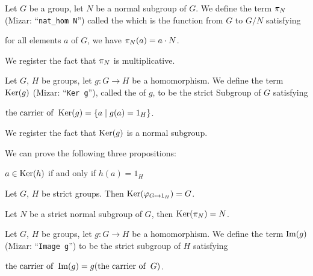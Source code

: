 \documentclass{article}
\begin{document}
\begin{definition}
Let $G$ be a group, let $N$ be a normal subgroup of $G$.
We define the term $\pi_{N}$ (Mizar: ``\verb#nat_hom N#'')
called the  which is the function from
$G$ to $G/N$ satisfying
\begin{defn}
\item for all elements $a$ of $G$, we have $\pi_{N}(a)=a\cdot N$.
\end{defn}
\end{definition}
We register the fact that $\pi_{N}$ is multiplicative.

\begin{definition}
Let $G$, $H$ be groups, let $g\colon G\to H$ be a homomorphism.
We define the term $\operatorname{Ker}(g)$ (Mizar: ``\verb#Ker g#''), called the
 of $g$, to be the strict Subgroup of $G$ satisfying
\begin{defn}
\item $\operatorname{the\ carrier\ of\ }\operatorname{Ker}(g)=\{a\mid g(a)=1_{H}\}$.
\end{defn}
\end{definition}
We register the fact that $\operatorname{Ker}(g)$ is a normal subgroup.

We can prove the following three propositions:
\begin{thm}
\item\label{group6:41} $a\in\operatorname{Ker}(h)$ if and only if $h(a)=1_{H}$
\item\label{group6:42} Let $G$, $H$ be strict groups. Then $\operatorname{Ker}(\varphi_{G\mapsto 1_{H}})=G$.
\item\label{group6:43} Let $N$ be a strict normal subgroup of $G$, then $\operatorname{Ker}(\pi_{N})=N$.
\end{thm}

\begin{definition}
Let $G$, $H$ be groups, let $g\colon G\to H$ be a homomorphism.
We define the term $\operatorname{Im}(g)$ (Mizar: ``\verb#Image g#'') to be the
strict subgroup of $H$ satisfying
\begin{defn}
\item $\operatorname{the\ carrier\ of\ }\operatorname{Im}(g)=g(\operatorname{the\ carrier\ of\ }G)$.
\end{defn}
\end{definition}
\end{document}
